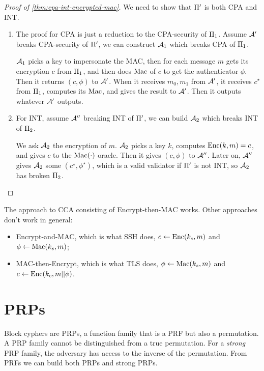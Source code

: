 \begin{proof}[Proof of \cref{thm:cpa-int-encrypted-mac}]
	We need to show that $\CCAScheme$ is both \ac{CPA} and \ac{INT}.
	\begin{enumerate}
		\item The proof for \ac{CPA} is just a reduction to the \ac{CPA}-security of $\SKEScheme[1]$.
			Assume $\Adv'$ breaks \ac{CPA}-security of $\CCAScheme$, we can construct $\Adv_1$ which breaks \ac{CPA} of $\SKEScheme[1]$.

			$\Adv_1$ picks a key to impersonate the \ac{MAC}, then for each message $m$ gets its encryption $c$ from $\SKEScheme[1]$, and then does $\GenericMac$ of $c$ to get the authenticator $\phi$.
			Then it returns $(c, \phi)$ to $\Adv'$.
			When it receives $m_0, m_1$ from $\Adv'$, it receives $c^{\star}$ from $\SKEScheme[1]$, computes its $\GenericMac$, and gives the result to $\Adv'$.
			Then it outputs whatever $\Adv'$ outputs.
		\item For \ac{INT}, assume $\Adv''$ breaking \ac{INT} of $\CCAScheme$, we can build $\Adv_2$ which breaks \ac{INT} of $\GenericMACScheme[2]$.

			We ask $\Adv_2$ the encryption of $m$.
			$\Adv_2$ picks a key $k$, computes $\SKEEnc(k, m) = c$, and gives $c$ to the $\GenericMac(\cdot)$ oracle.
			Then it gives $(c, \phi)$ to $\Adv''$.
			Later on, $\Adv''$ gives $\Adv_2$ some $(c^{\star}, \phi^{\star})$, which is a valid validator if $\CCAScheme$ is not \ac{INT}, so $\Adv_2$ has broken $\GenericMACScheme[2]$. \qedhere
	\end{enumerate}
\end{proof}

The approach to \ac{CCA} consisting of Encrypt-then-\ac{MAC} works.
Other approaches don't work in general:
\begin{itemize}
	\item Encrypt-and-\ac{MAC}, which is what \ac{SSH} does, \ie $c \from \SKEEnc(k_c, m)$ and $\phi \from \GenericMac(k_s, m)$;
	\item \ac{MAC}-then-Encrypt, which is what \ac{TLS} does, \ie $\phi \from \GenericMac(k_s, m)$ and $c \from \SKEEnc(k_c, m || \phi)$.
\end{itemize}

\section{\aclp{PRP}}

Block cyphers are \acp{PRP}, a function family that is a \ac{PRF} but also a permutation.
A \ac{PRP} family cannot be distinguished from a true permutation.
For a \emph{strong} \ac{PRP} family, the adversary has access to the inverse of the permutation.
From \acp{PRF} we can build both \acp{PRP} and strong \acp{PRP}.

